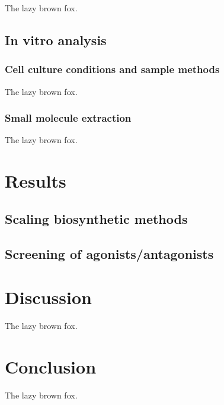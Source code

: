 \begin{refsection}
The lazy brown fox.

\subsection{In vitro analysis}

\subsubsection{Cell culture conditions and sample methods}

The lazy brown fox.

\subsubsection{Small molecule extraction}

The lazy brown fox.

\section{Results}

\subsection{Scaling biosynthetic methods}

\subsection{Screening of agonists/antagonists}

\section{Discussion}
The lazy brown fox.

\section{Conclusion}
The lazy brown fox.


\printbibliography[heading=subbibliography]

\end{refsection}
